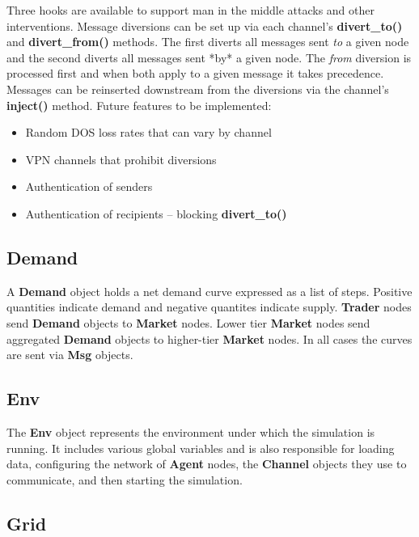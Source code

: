 \documentclass[12pt]{article}
\begin{document}
Three hooks are available to support man in the middle attacks and other 
interventions.  Message diversions can be set up via each channel's 
\textbf{divert\_to()} and \textbf{divert\_from()} methods. The first diverts all 
messages sent \textit{to} a given node and the second diverts all messages sent
*by* a given node. The \textit{from} diversion is processed first and when both 
apply to a given message it takes precedence.  Messages can be reinserted 
downstream from the diversions via the channel's \textbf{inject()} method.  Future 
features to be implemented:

\begin{itemize}
  \item{Random DOS loss rates that can vary by channel}
  \item{VPN channels that prohibit diversions}
  \item{Authentication of senders}
  \item{Authentication of recipients -- blocking \textbf{divert\_to()}}
\end{itemize}

\subsection{Demand} \mbox{}

A \textbf{Demand} object holds a net demand curve expressed as a list of steps.
Positive quantities indicate demand and negative quantites indicate supply.
\textbf{Trader} nodes send \textbf{Demand} objects to \textbf{Market} nodes.  Lower tier 
\textbf{Market} nodes send aggregated \textbf{Demand} objects to higher-tier \textbf{Market} 
nodes.  In all cases the curves are sent via \textbf{Msg} objects.

\subsection{Env} \mbox{}

The \textbf{Env} object represents the environment under which the simulation
is running.  It includes various global variables and is also responsible
for loading data, configuring the network of \textbf{Agent} nodes, 
the \textbf{Channel} objects they use to communicate, and then starting the
simulation.

\subsection{Grid} \mbox{}
\end{document}
